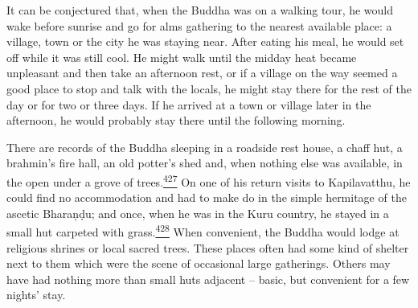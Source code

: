 It can be conjectured that, when the Buddha was on a walking tour, he
would wake before sunrise and go for alms gathering to the nearest
available place: a village, town or the city he was staying near. After
eating his meal, he would set off while it was still cool. He might walk
until the midday heat became unpleasant and then take an afternoon rest,
or if a village on the way seemed a good place to stop and talk with the
locals, he might stay there for the rest of the day or for two or three
days. If he arrived at a town or village later in the afternoon, he
would probably stay there until the following morning.

There are records of the Buddha sleeping in a roadside rest house, a
chaff hut, a brahmin's fire hall, an old potter's shed and, when nothing
else was available, in the open under a grove of
trees.\label{footprints_split_012.html_fnref427}\hyperref[footprints_split_025.htmlux5cux23fn427]{\textsuperscript{427}}
On one of his return visits to Kapilavatthu, he could find no
accommodation and had to make do in the simple hermitage of the ascetic
Bharaṇḍu; and once, when he was in the Kuru country, he stayed in a
small hut carpeted with
grass.\label{footprints_split_012.html_fnref428}\hyperref[footprints_split_025.htmlux5cux23fn428]{\textsuperscript{428}}
When convenient, the Buddha would lodge at religious shrines or local
sacred trees. These places often had some kind of shelter next to them
which were the scene of occasional large gatherings. Others may have had
nothing more than small huts adjacent -- basic, but convenient for a few
nights' stay.

